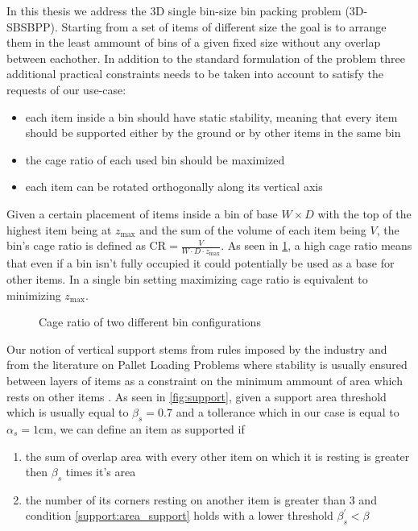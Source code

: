 In this thesis we address the 3D single bin-size bin packing problem (3D-SBSBPP). Starting from a set of items of different size the goal is to arrange them in the least ammount of bins of a given fixed size without any overlap between eachother.
In addition to the standard formulation of the problem three additional practical constraints needs to be taken into account to satisfy the requests of our use-case:
\begin{itemize}
    \item each item inside a bin should have static stability, meaning that every item should be supported either by the ground or by other items in the same bin
    \item the cage ratio of each used bin should be maximized
    \item each item can be rotated orthogonally along its vertical axis
\end{itemize}

Given a certain placement of items inside a bin of base $W \times D$ with the top of the highest item being at $z_\text{max}$ and the sum of the volume of each item being $V$, the bin's cage ratio is defined as $\text{CR} = \frac{V}{W \cdot D \cdot z_\text{max}}$.
As seen in \cref{fig:cage_ratio}, a high cage ratio means that even if a bin isn't fully occupied it could potentially be used as a base for other items. In a single bin setting maximizing cage ratio is equivalent to minimizing $z_\text{max}$.

\begin{figure}[H]
    \scalebox{0.60}{%
    
    }
    \caption{Cage ratio of two different bin configurations}
    \label{fig:cage_ratio}
\end{figure}

Our notion of vertical support stems from rules imposed by the industry and from the literature on Pallet Loading Problems where stability is usually ensured between layers of items as a constraint on the minimum ammount of area which rests on other items \cite{elhedhli2019three}.
As seen in \cref{fig:support}, given a support area threshold which is usually equal to $\beta_s=0.7$ and a tollerance which in our case is equal to $\alpha_s=1\text{cm}$, we can define an item as supported if
\begin{enumerate}
    \item the sum of overlap area with every other item on which it is resting is greater then $\beta_s$ times it's area \label{support:area_support}
    \item the number of its corners resting on another item is greater than 3 and condition \ref{support:area_support} holds with a lower threshold $\beta^\prime_s < \beta$ \label{support:vertex_support}
\end{enumerate}

